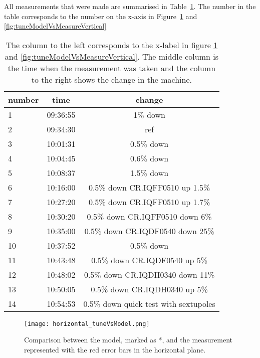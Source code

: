 All measurements that were made are summarised in Table~\ref{tab:tuneMeasureTime}. 
The number in the table corresponds to the number on the x-axis in 
Figure~\ref{fig:tuneModelVsMeasureHorizontal} and \ref{fig:tuneModelVsMeasureVertical}
\begin{table}[ht]
\centering
\begin{tabular}{| l | c | c |}
\hline
\textbf{number} & \textbf{time} & \textbf{change} \\ \hline
1 & 09:36:55 & 1\% down \\
2 & 09:34:30 & ref \\
3 & 10:01:31 & 0.5\% down \\
4 & 10:04:45 & 0.6\% down   \\
5 & 10:08:37 & 1.5\% down  \\
6 & 10:16:00 & 0.5\% down  CR.IQFF0510 up 1.5\% \\
7 & 10:27:20 & 0.5\% down  CR.IQFF0510 up 1.7\% \\
8 & 10:30:20 & 0.5\% down  CR.IQFF0510 down 6\% \\
9 & 10:35:00  & 0.5\% down  CR.IQDF0540 down 25\% \\
10 & 10:37:52 &  0.5\% down \\
11 & 10:43:48 &  0.5\% down  CR.IQDF0540 up 5\% \\
12 & 10:48:02 &  0.5\% down  CR.IQDH0340 down 11\% \\
13 & 10:50:05 &  0.5\% down  CR.IQDH0340 up 5\% \\
14 & 10:54:53 &  0.5\% down  quick test with sextupoles \\
\hline
\end{tabular}
\caption[Time and numbering of the tune measurement.]
{The column to the left corresponds to the x-label in 
figure \ref{fig:tuneModelVsMeasureHorizontal} and \ref{fig:tuneModelVsMeasureVertical}. 
The middle column is the time when the measurement was taken and 
the column to the right shows the change in the machine.  \label{tab:tuneMeasureTime}}
\end{table}
\begin{figure}[!h]
\centering
\texttt{[image: horizontal\_tuneVsModel.png]}
\caption[Comparison between the tune from the model and the measurement in the horizontal plane]
{Comparison between the model, marked as *, 
and the measurement represented with the red error bars in the horizontal plane. 
\label{fig:tuneModelVsMeasureHorizontal}}
\end{figure}
 
